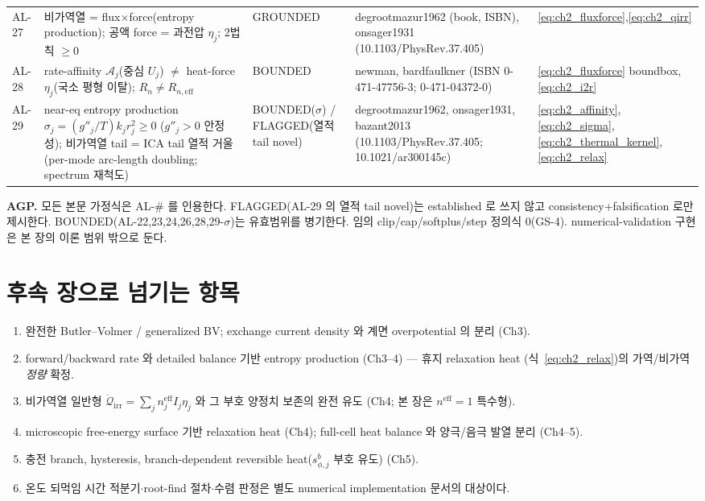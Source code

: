 \documentclass[11pt,a4paper]{article}
\newcommand{\eff}{\mathrm{eff}}
\newcommand{\irr}{\mathrm{irr}}
\begin{document}
{\begin{longtable}{p{} p{} p{} p{} p{}}
AL-27 & 비가역열 = flux$\times$force(entropy production); 공액 force = 과전압 $\eta_j$; 2법칙 $\ge0$ & GROUNDED & degrootmazur1962 (book, ISBN), onsager1931 (10.1103/PhysRev.37.405) & \eqref{eq:ch2_fluxforce},\eqref{eq:ch2_qirr} \\
AL-28 & rate-affinity $\mathcal A_j$(중심 $U_j$) $\ne$ heat-force $\eta_j$(국소 평형 이탈); $R_n\ne R_{n,\eff}$ & BOUNDED & newman, bardfaulkner (ISBN 0-471-47756-3; 0-471-04372-0) & \eqref{eq:ch2_fluxforce} boundbox,\eqref{eq:ch2_i2r} \\
AL-29 & near-eq entropy production $\sigma_j=(g''_j/T)k_j r_j^2\ge0$ ($g''_j>0$ 안정성); 비가역열 tail = ICA tail 열적 거울 (per-mode arc-length doubling; spectrum 재척도) & BOUNDED($\sigma$) / FLAGGED(열적 tail novel) & degrootmazur1962, onsager1931, bazant2013 (10.1103/PhysRev.37.405; 10.1021/ar300145c) & \eqref{eq:ch2_affinity},\eqref{eq:ch2_sigma},\eqref{eq:ch2_thermal_kernel},\eqref{eq:ch2_relax} \\
\bottomrule
\end{longtable}
}
\textbf{AGP.} 모든 본문 가정식은 AL-\# 를 인용한다. FLAGGED(AL-29 의 열적 tail novel)는 established 로 쓰지
않고 consistency+falsification 로만 제시한다. BOUNDED(AL-22,23,24,26,28,29-$\sigma$)는 유효범위를 병기한다.
임의 clip/cap/softplus/step 정의식 0(GS-4). numerical-validation 구현은 본 장의 이론 범위 밖으로 둔다.

\section{후속 장으로 넘기는 항목}\label{sec:ch2_transmit}
\begin{enumerate}[label=\arabic*),leftmargin=2.0em]
\item 완전한 Butler--Volmer / generalized BV; exchange current density 와 계면 overpotential 의 분리 (Ch3).
\item forward/backward rate 와 detailed balance 기반 entropy production (Ch3--4) — 휴지 relaxation heat
  (식~\eqref{eq:ch2_relax})의 가역/비가역 \emph{정량} 확정.
\item 비가역열 일반형 $\dot{\mathcal Q}_{\irr}=\sum_j n_j^{\eff}I_j\eta_j$ 와 그 부호 양정치 보존의 완전 유도
  (Ch4; 본 장은 $n^\eff=1$ 특수형).
\item microscopic free-energy surface 기반 relaxation heat (Ch4); full-cell heat balance 와 양극/음극 발열
  분리 (Ch4--5).
\item 충전 branch, hysteresis, branch-dependent reversible heat($s_{\phi,j}^b$ 부호 유도) (Ch5).
\item 온도 되먹임 시간 적분기$\cdot$root-find 절차$\cdot$수렴 판정은 별도 numerical implementation 문서의 대상이다.
\end{enumerate}
\end{document}
